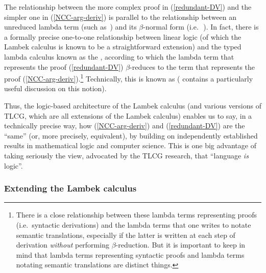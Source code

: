 \documentclass[output=paper,biblatex,babelshorthands,newtxmath,draftmode,colorlinks,citecolor=brown]{langscibook}
\begin{document}
The relationship between the more complex proof in (\ref{redundant-DV}) and
the simpler one in (\ref{NCC-arg-deriv}) is parallel to the relationship
between an unreduced lambda term (such as
\,)
and its
$\beta$-normal form (i.e.\  \,).
In fact, there is a formally precise
one-to-one relationship between linear logic (of which the Lambek calculus is known
to be a straightforward extension) and the typed lambda calculus known
as the  \citep{howard80}, according to which
the lambda term that represents the proof 
(\ref{redundant-DV}) $\beta$-reduces  to the term that represents the proof
(\ref{NCC-arg-deriv}).\footnote{There is a close relationship between these
lambda terms representing proofs (i.e.\ syntactic derivations) and the
lambda  terms that one writes 
to notate semantic translations, especially if the latter is written 
at each step of derivation \emph{without} performing $\beta$-reduction. But
it is important to keep in mind that
lambda terms representing syntactic proofs
and lambda terms notating semantic translations are distinct things.}
Technically, this is known as 
(\citealt[36--42, 137--144]{jaeger05} contains a particularly useful discussion on this notion). 

Thus, the logic-based architecture of the Lambek calculus (and various versions of
TLCG, which are all extensions of the Lambek calculus) enables us to say, in a
technically precise way, how (\ref{NCC-arg-deriv}) and (\ref{redundant-DV}) are
the ``same'' (or, more precisely, equivalent), by building on
independently established results in mathematical logic and computer
science. This is one big advantage of taking seriously the view,
advocated by the TLCG research, that ``language \emph{is} logic''.


\subsubsection{Extending the Lambek calculus \label{sec:extending}}
\end{document}
